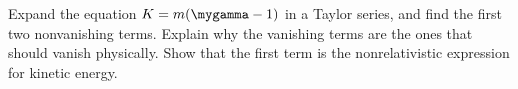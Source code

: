 Expand the equation $K = m(\mygamma-1)$ in a Taylor series, and find the
first two nonvanishing terms. Explain why the vanishing terms are
the ones that should vanish physically.
Show that the first term is the nonrelativistic
expression for kinetic energy.
